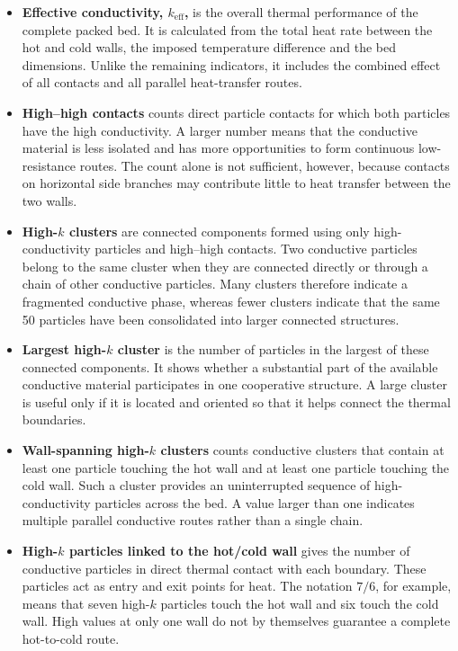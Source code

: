\documentclass[12pt,a4paper]{article}
\begin{document}
	\begin{itemize}
		\item \textbf{Effective conductivity, $k_{\mathrm{eff}}$,} is the overall
		thermal performance of the complete packed bed. It is calculated from the
		total heat rate between the hot and cold walls, the imposed temperature
		difference and the bed dimensions. Unlike the remaining indicators, it
		includes the combined effect of all contacts and all parallel heat-transfer
		routes.
		
		\item \textbf{High--high contacts} counts direct particle contacts for which
		both particles have the high conductivity. A larger number means that the
		conductive material is less isolated and has more opportunities to form
		continuous low-resistance routes. The count alone is not sufficient, however,
		because contacts on horizontal side branches may contribute little to heat
		transfer between the two walls.
		
		\item \textbf{High-$k$ clusters} are connected components formed using only
		high-conductivity particles and high--high contacts. Two conductive particles
		belong to the same cluster when they are connected directly or through a chain
		of other conductive particles. Many clusters therefore indicate a fragmented
		conductive phase, whereas fewer clusters indicate that the same 50 particles
		have been consolidated into larger connected structures.
		
		\item \textbf{Largest high-$k$ cluster} is the number of particles in the
		largest of these connected components. It shows whether a substantial part of
		the available conductive material participates in one cooperative structure.
		A large cluster is useful only if it is located and oriented so that it helps
		connect the thermal boundaries.
		
		\item \textbf{Wall-spanning high-$k$ clusters} counts conductive clusters
		that contain at least one particle touching the hot wall and at least one
		particle touching the cold wall. Such a cluster provides an uninterrupted
		sequence of high-conductivity particles across the bed. A value larger than
		one indicates multiple parallel conductive routes rather than a single chain.
		
		\item \textbf{High-$k$ particles linked to the hot/cold wall} gives the number
		of conductive particles in direct thermal contact with each boundary. These
		particles act as entry and exit points for heat. The notation $7/6$, for
		example, means that seven high-$k$ particles touch the hot wall and six touch
		the cold wall. High values at only one wall do not by themselves guarantee a
		complete hot-to-cold route.
		

\end{itemize}
\end{document}
